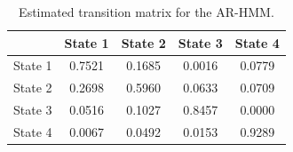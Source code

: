 \begin{table}[ht]
\centering
\begin{tabular}{lcccc}
\hline
 & State 1 & State 2 & State 3 & State 4 \\
\hline
State 1 & 0.7521 & 0.1685 & 0.0016 & 0.0779 \\
State 2 & 0.2698 & 0.5960 & 0.0633 & 0.0709 \\
State 3 & 0.0516 & 0.1027 & 0.8457 & 0.0000 \\
State 4 & 0.0067 & 0.0492 & 0.0153 & 0.9289 \\
\hline
\end{tabular}
\caption{Estimated transition matrix for the AR-HMM.}
\label{tab:ar_hmm_transition}
\end{table}
